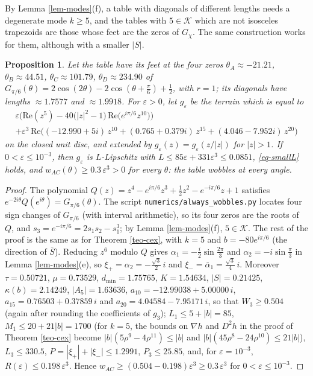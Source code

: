 \documentclass[a4paper,11pt,twoside,leqno]{article}
\newtheorem{prop}[teo]{Proposition}
\newcommand{\eps}[0]{\varepsilon}
\numberwithin{equation}{section}
\begin{document}
By Lemma \ref{lem-modes}(f), a table with diagonals of different lengths needs a degenerate mode $k \geq 5$, and the tables with $5 \in \mathcal{K}$ which are not isosceles trapezoids are those whose feet are the zeros of $G_\chi$. The same construction works for them, although with a smaller $|S|$.

\begin{prop}\label{prop-cex-uneq}
Let the table have its feet at the four zeros $\theta_A \approx -21.21$\textdegree{}, $\theta_B \approx 44.51$\textdegree{}, $\theta_C \approx 101.79$\textdegree{}, $\theta_D \approx 234.90$\textdegree{} of $G_{\pi/6}(\theta) = 2\cos(2\theta) - 2\cos(\theta + \frac{\pi}{6}) + \frac{1}{2}$, with $r = 1$; its diagonals have lengths $\approx 1.7577$ and $\approx 1.9918$. For $\eps > 0$, let $g_\eps$ be the terrain which is equal to
\begin{multline*}
\eps \Big( \mathrm{Re}(z^5) - 40\big(|z|^2 - 1\big)\, \mathrm{Re}\big(e^{i\pi/6} z^{10}\big) \Big) \\
+ \eps^3\, \mathrm{Re}\Big( (-12.990 + 5 i)\, z^{10} + (0.765 + 0.379 i)\, z^{15} + (4.046 - 7.952 i)\, z^{20} \Big)
\end{multline*}
on the closed unit disc, and extended by $g_\eps(z) = g_\eps(z/|z|)$ for $|z| > 1$. If $0 < \eps \leq 10^{-3}$, then $g_\eps$ is $L$-Lipschitz with $L \leq 85\eps + 331\eps^3 \leq 0.0851$, \eqref{eq-smallL} holds, and $w_{AC}(\theta) \geq 0.3\,\eps^3 > 0$ for every $\theta$: the table wobbles at every angle.
\end{prop}
\begin{proof}
The polynomial $Q(z) = z^4 - e^{i\pi/6}z^3 + \frac{1}{2}z^2 - e^{-i\pi/6}z + 1$ satisfies $e^{-2i\theta}Q(e^{i\theta}) = G_{\pi/6}(\theta)$. The script \texttt{numerics/always\_wobbles.py} locates four sign changes of $G_{\pi/6}$ (with interval arithmetic), so its four zeros are the roots of $Q$, and $s_3 = e^{-i\pi/6} = 2 s_1 s_2 - s_1^3$; by Lemma \ref{lem-modes}(f), $5 \in \mathcal{K}$. The rest of the proof is the same as for Theorem \ref{teo-cex}, with $k = 5$ and $b = -80 e^{i\pi/6}$ (the direction of $\bar S$). Reducing $z^6$ modulo $Q$ gives $\alpha_1 = -\frac{i}{2}\sin\frac{2\pi}{3}$ and $\alpha_2 = -i \sin\frac{\pi}{3}$ in Lemma \ref{lem-modes}(e), so $\xi_+ = \alpha_2 = -\frac{\sqrt{3}}{2}\, i$ and $\xi_- = \bar\alpha_1 = \frac{\sqrt{3}}{4}\, i$. Moreover $\tau = 0.50721$, $\mu = 0.73529$, $d_{\min} = 1.75765$, $K = 1.54634$, $|S| = 0.21425$, $\kappa(b) = 2.14249$, $|A_5| = 1.63636$, $a_{10} = -12.99038 + 5.00000\, i$, $a_{15} = 0.76503 + 0.37859\, i$ and $a_{20} = 4.04584 - 7.95171\, i$, so that $W_3 \geq 0.504$ (again after rounding the coefficients of $g_3$); $L_1 \leq 5 + |b| = 85$, $M_1 \leq 20 + 21|b| = 1700$ (for $k = 5$, the bounds on $\nabla h$ and $D^2 h$ in the proof of Theorem \ref{teo-cex} become $|b|(5\rho^9 - 4\rho^{11}) \leq |b|$ and $|b|(45\rho^8 - 24\rho^{10}) \leq 21|b|$), $L_3 \leq 330.5$, $P = |\xi_+| + |\xi_-| \leq 1.2991$, $P_3 \leq 25.85$, and, for $\eps = 10^{-3}$, $R(\eps) \leq 0.198\,\eps^3$. Hence $w_{AC} \geq (0.504 - 0.198)\eps^3 \geq 0.3\,\eps^3$ for $0 < \eps \leq 10^{-3}$.
\end{proof}
\end{document}
